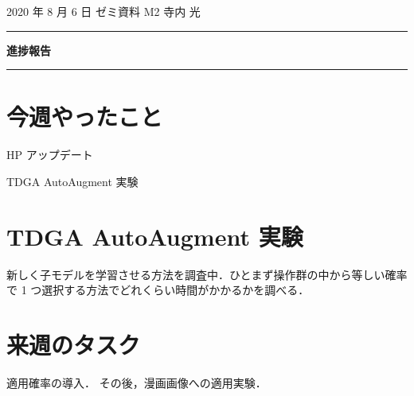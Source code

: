 \documentclass[onecolumn]{ujarticle}   %
\begin{document}
	\noindent

	\hspace{1em}
	2020 年 8 月 6 日
	ゼミ資料
	\hfill
	M2 寺内 光

	\vspace{2mm}

	\hrule

	\begin{center}
		{\Large \bf 進捗報告}
	\end{center}

	\hrule
	\vspace{3mm}

	\section{今週やったこと}
	\begin{itemize}{
    \item{HP アップデート}
    \item{TDGA AutoAugment 実験}
	}\end{itemize}

  \section{TDGA AutoAugment 実験}
  新しく子モデルを学習させる方法を調査中．ひとまず操作群の中から等しい確率で 1 つ選択する方法でどれくらい時間がかかるかを調べる．

	\section{来週のタスク}
	適用確率の導入．
  その後，漫画画像への適用実験．


\end{document}
